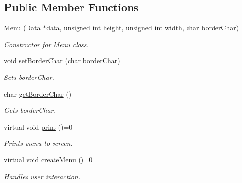 \subsection*{Public Member Functions}
\begin{DoxyCompactItemize}
\item 
\hyperlink{class_menu_aaadfa629cab782a6087766f4fc7b19a6}{Menu} (\hyperlink{class_data}{Data} $\ast$\hyperlink{class_menu_a3914261df4f4fbadd9c0a854a5f42b0b}{data}, unsigned int \hyperlink{class_menu_a84dd6e7e6b263601781683951687bf42}{height}, unsigned int \hyperlink{class_menu_a934c7679ed1575cc9924919b9b3eccb1}{width}, char \hyperlink{class_menu_a912c40f15f93092412c8d6204c0f8788}{border\+Char})
\begin{DoxyCompactList}\small\item\em Constructor for \hyperlink{class_menu}{Menu} class. \end{DoxyCompactList}\item 
void \hyperlink{class_menu_aa0503578e77400a5609f039ed62d44e7}{set\+Border\+Char} (char \hyperlink{class_menu_a912c40f15f93092412c8d6204c0f8788}{border\+Char})
\begin{DoxyCompactList}\small\item\em Sets border\+Char. \end{DoxyCompactList}\item 
char \hyperlink{class_menu_afdd6e6b09535ca48838c22d5a753dcfc}{get\+Border\+Char} ()
\begin{DoxyCompactList}\small\item\em Gets border\+Char. \end{DoxyCompactList}\item 
\hypertarget{class_menu_ae1857de4af042320041da50debf81709}{}virtual void \hyperlink{class_menu_ae1857de4af042320041da50debf81709}{print} ()=0\label{class_menu_ae1857de4af042320041da50debf81709}

\begin{DoxyCompactList}\small\item\em Prints menu to screen. \end{DoxyCompactList}\item 
\hypertarget{class_menu_af71cfef966c0dfd5ecf5d585ddb16514}{}virtual void \hyperlink{class_menu_af71cfef966c0dfd5ecf5d585ddb16514}{create\+Menu} ()=0\label{class_menu_af71cfef966c0dfd5ecf5d585ddb16514}

\begin{DoxyCompactList}\small\item\em Handles user interaction. \end{DoxyCompactList}\end{DoxyCompactItemize}
